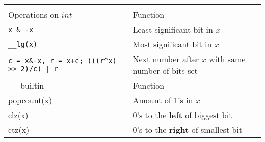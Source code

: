 \begin{tabular}{ |p{3cm}|p{5cm}|  }
  \hline  
  \rowcolor{Gray} 
  \multicolumn{2}{|c|}{Bits++} \\
  \rowcolor{Gray} 
  \hline
  Operations on $int$ & Function \\
  \hline
  \texttt{x \& -x} & Least significant bit in $x$ \\
  \rowcolor{Gray} 
  \texttt{\_\_lg(x)} & Most significant bit in $x$ \\
  \texttt{c = x\&-x, r = x+c; (((r\^{}x) >> 2)/c) | r} & Next number after $x$ with same number of bits set \\
  \hline
  \rowcolor{Gray} 
  \_\_builtin\_ & Function \\
  \hline 
  popcount(x) & Amount of 1's in $x$ \\
  \rowcolor{Gray} 
  clz(x) & 0's to the \textbf{left} of biggest bit \\
  ctz(x) & 0's to the \textbf{right} of smallest bit \\
  \hline
\end{tabular}